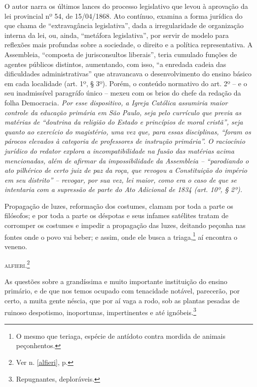 \begin{didascalia}
O autor narra os últimos lances do processo legislativo que levou à
aprovação da lei provincial nº 54, de 15/04/1868. Ato contínuo, examina
a forma jurídica do que chama de ``extravagância legislativa'', dada a
irregularidade de organização interna da lei, ou, ainda, ``metáfora
legislativa'', por servir de modelo para reflexões mais profundas sobre a
sociedade, o direito e a política representativa. A Assembleia,
``composta de jurisconsultos liberais'', teria cumulado funções de agentes
públicos distintos, aumentando, com isso, ``a enredada cadeia das
dificuldades administrativas'' que atravancava o desenvolvimento do
ensino básico em cada localidade (art. 1º, § 3º). Porém, o conteúdo
normativo do art. 2º -- e o seu inadmissível paragráfo único -- mexeu
com os brios do chefe da redação da folha Democracia\emph{. Por esse
dispositivo, a Igreja Católica assumiria maior controle da educação
primária em São Paulo, seja pelo currículo que previa as matérias de
``doutrina da religião do Estado e princípios de moral cristã'', seja
quanto ao exercício do magistério, uma vez que, para essas disciplinas,
``foram os párocos elevados à categoria de professores de instrução
primária''. O raciocínio jurídico do redator explora a incompatibilidade
na fusão das matérias acima mencionadas, além de afirmar da
impossibilidade da Assembleia -- ``parodiando o ato pilhérico de certo
juiz de paz da roça, que revogou a Constituição do império em seu
distrito'' -- revogar, por sua vez, lei maior, como era o caso de que se
intentaria com a supressão de parte do Ato Adicional de 1834 (art. 10º,
§ 2º).}
\end{didascalia}



Propagação de luzes, reformação dos costumes, clamam por toda a parte os
filósofos; e por toda a parte os déspotas e seus infames satélites
tratam de corromper os costumes e impedir a propagação das luzes,
deitando peçonha nas fontes onde o povo vai beber; e assim, onde ele
busca a triaga,\footnote{O mesmo que teriaga, espécie de antídoto
  contra mordida de animais peçonhentos.} aí encontra o veneno.

\textsc{alfieri}.\footnote{Ver n. \ref{alfieri}, p. \pageref{alfieri}}

As questões sobre a grandíssima e muito importante instituição do ensino
primário, e de que nos temos ocupado com tenacidade notável, parecerão,
por certo, a muita gente néscia, que por aí vaga a rodo, sob as plantas
pesadas de ruinoso despotismo, inoportunas, impertinentes e até
ignóbeis.\footnote{Repugnantes, deploráveis.}

